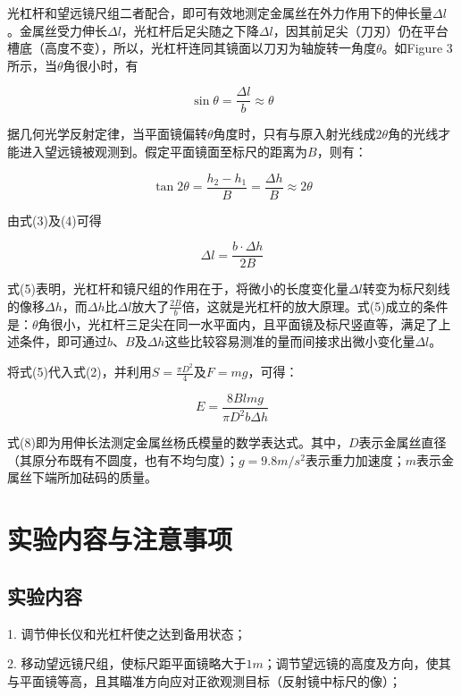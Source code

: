 \documentclass{article}
\begin{document}
光杠杆和望远镜尺组二者配合，即可有效地测定金属丝在外力作用下的伸长量\(\Delta l\)。金属丝受力伸长\(\Delta l\)，光杠杆后足尖随之下降\(\Delta l\)，因其前足尖（刀刃）仍在平台槽底（高度不变），所以，光杠杆连同其镜面以刀刃为轴旋转一角度\(\theta\)。如Figure 3所示，当\(\theta\)角很小时，有

\begin{equation}
    \sin\theta = \frac{\Delta l}{b} \approx \theta
\end{equation}

据几何光学反射定律，当平面镜偏转\(\theta\)角度时，只有与原入射光线成\(2\theta\)角的光线才能进入望远镜被观测到。假定平面镜面至标尺的距离为\(B\)，则有：

\begin{equation}
    \tan 2\theta = \frac{h_2 - h_1}{B} = \frac{\Delta h}{B} \approx 2\theta 
\end{equation}

由式(3)及(4)可得

\begin{equation}
    \Delta l = \frac{b \cdot \Delta h}{2B} 
\end{equation}

式(5)表明，光杠杆和镜尺组的作用在于，将微小的长度变化量\(\Delta l\)转变为标尺刻线的像移\(\Delta h\)，而\(\Delta h\)比\(\Delta l\)放大了\(\frac{2B}{b}\)倍，这就是光杠杆的放大原理。式(5)成立的条件是：\(\theta\)角很小，光杠杆三足尖在同一水平面内，且平面镜及标尺竖直等，满足了上述条件，即可通过\(b\)、\(B\)及\(\Delta h\)这些比较容易测准的量而间接求出微小变化量\(\Delta l\)。

将式(5)代入式(2)，并利用\(S = \frac{\pi D^2}{4}\)及\(F = mg\)，可得：

\begin{equation}
    E = \frac{8Blmg}{\pi D^2 b \Delta h} 
\end{equation}

式(8)即为用伸长法测定金属丝杨氏模量的数学表达式。其中，\(D\)表示金属丝直径（其原分布既有不圆度，也有不均匀度）；\(g = 9.8m/s^2\)表示重力加速度；\(m\)表示金属丝下端所加砝码的质量。


\section{实验内容与注意事项}
\subsection{实验内容}
1. 调节伸长仪和光杠杆使之达到备用状态；

2. 移动望远镜尺组，使标尺距平面镜略大于\(1m\)；调节望远镜的高度及方向，使其与平面镜等高，且其瞄准方向应对正欲观测目标（反射镜中标尺的像）； 
\end{document}

